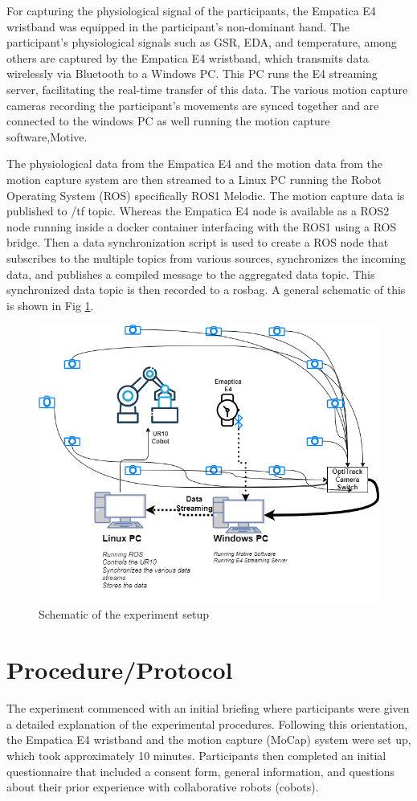 For capturing the physiological signal of the participants, the Empatica E4 wristband was equipped in the participant's non-dominant hand. The participant's physiological signals such as \gls{GSR}, \gls{EDA},  and temperature, among others are captured by the Empatica E4 wristband, which transmits data wirelessly via Bluetooth to a Windows PC. This PC runs the E4 streaming server, facilitating the real-time transfer of this data. The various motion capture cameras recording the participant's movements are synced  together and are connected to the windows PC as well running the motion capture software,Motive. 

The physiological data from the Empatica E4 and the motion data from the motion capture system are then streamed to a Linux PC running the Robot Operating System (ROS) specifically ROS1 Melodic.
The motion capture data is published to /tf topic. Whereas the Empatica E4 node is available as a ROS2 node running inside a docker container interfacing with the ROS1 using a ROS bridge.
Then a data synchronization script is used to create a ROS node that subscribes to the multiple topics from various sources, synchronizes the incoming data, and publishes a compiled message to the aggregated data topic.
This synchronized data topic is then recorded to a rosbag. A general schematic of this is shown in Fig \ref{fig:netwrok}.


\begin{figure}[h]
	\centering
	\includegraphics[width=0.8\columnwidth]{images/network2.png}
	\caption{Schematic of the experiment setup}
	\label{fig:netwrok}
\end{figure}




\section{Procedure/Protocol}
The experiment commenced with an initial briefing where participants were given a detailed explanation of the experimental procedures. Following this orientation, the Empatica E4 wristband and the motion capture (MoCap) system were set up, which took approximately 10 minutes. Participants then completed an initial questionnaire that included a consent form, general information, and questions about their prior experience with collaborative robots (cobots).

